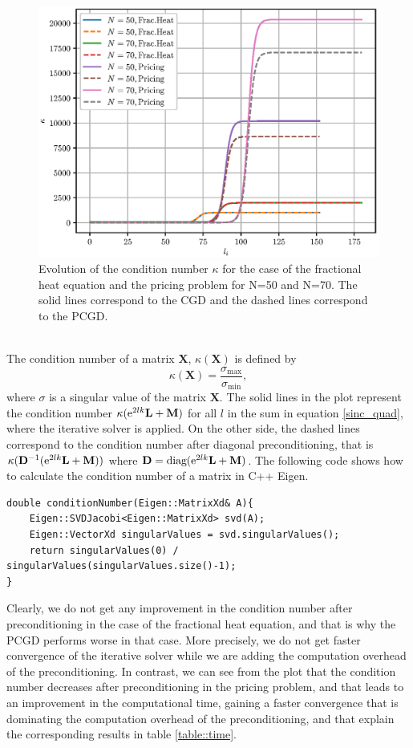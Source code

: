 \begin{figure}[h]
  \centering
  \includegraphics[width=0.5\linewidth]{figures/kappa.eps}
  \caption{Evolution of the condition number $\kappa$ for the case of the fractional heat equation and the pricing problem for N=50 and N=70. The solid lines correspond to the CGD and the dashed lines correspond to the PCGD.}
  \label{fig:kappa}
\end{figure}\\
The condition number of a matrix $\mathbf{X}$, $\kappa(\mathbf{X})$ is defined by
\begin{equation*}
\kappa(\mathbf{X}) = \frac{\sigma_{\text{max}}}{\sigma_{\text{min}}},
\end{equation*}
where $\sigma$ is a singular value of the matrix $\mathbf{X}$. The solid lines in the plot represent the condition number $\kappa(\text{e}^{2lk}\mathbf{L}+\mathbf{M})$ for all $l$ in the sum in equation \eqref{sinc_quad}, where the iterative solver is applied. On the other side, the dashed lines correspond to the condition number after diagonal preconditioning, that is $\kappa(\mathbf{D}^{-1}(\text{e}^{2lk}\mathbf{L}+\mathbf{M}))$ where $\mathbf{D}=\text{diag}(\text{e}^{2lk}\mathbf{L}+\mathbf{M})$. The following code shows how to calculate the condition number of a matrix in C++ Eigen.
\begin{lstlisting}[caption={Condition number computation in C++.}] 
double conditionNumber(Eigen::MatrixXd& A){
	Eigen::SVDJacobi<Eigen::MatrixXd> svd(A); 
	Eigen::VectorXd singularValues = svd.singularValues();
	return singularValues(0) / singularValues(singularValues.size()-1); 
}
\end{lstlisting}
Clearly, we do not get any improvement in the condition number after preconditioning in the case of the fractional heat equation, and that is why the PCGD performs worse in that case. More precisely, we do not get faster convergence of the iterative solver while we are adding the computation overhead of the preconditioning. In contrast, we can see from the plot that the condition number decreases after preconditioning in the pricing problem, and that leads to an improvement in the computational time, gaining a faster convergence that is dominating the computation overhead of the preconditioning, and that explain the corresponding results in table \eqref{table::time}.
